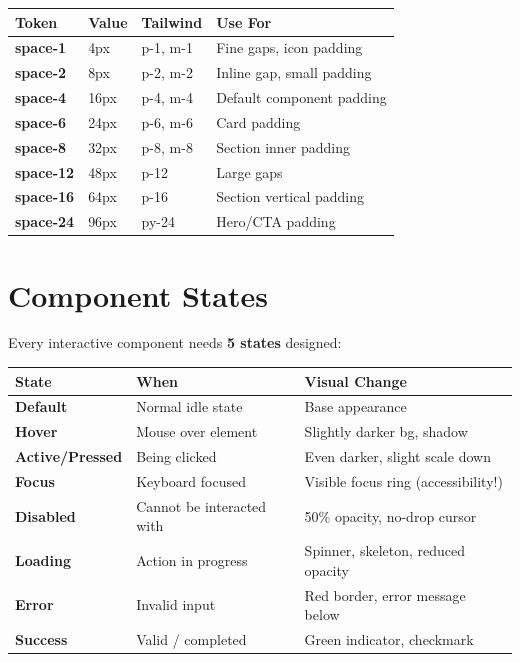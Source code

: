 \documentclass[12pt,a4paper]{article}
\begin{document}
\begin{center}
\begin{tabularx}{\textwidth}{|>{\bfseries}l|l|l|X|}
\hline
\rowcolor{FaranDark}
\color{white}\textbf{Token} & \color{white}\textbf{Value} & \color{white}\textbf{Tailwind} & \color{white}\textbf{Use For} \\
\hline
space-1 & 4px & p-1, m-1 & Fine gaps, icon padding \\
\hline
\rowcolor{SectionBg}
space-2 & 8px & p-2, m-2 & Inline gap, small padding \\
\hline
space-4 & 16px & p-4, m-4 & Default component padding \\
\hline
\rowcolor{SectionBg}
space-6 & 24px & p-6, m-6 & Card padding \\
\hline
space-8 & 32px & p-8, m-8 & Section inner padding \\
\hline
\rowcolor{SectionBg}
space-12 & 48px & p-12 & Large gaps \\
\hline
space-16 & 64px & p-16 & Section vertical padding \\
\hline
\rowcolor{SectionBg}
space-24 & 96px & py-24 & Hero/CTA padding \\
\hline
\end{tabularx}
\end{center}

\newpage

\section{Component States}

Every interactive component needs \textbf{5 states} designed:

\begin{center}
\begin{tabularx}{\textwidth}{|>{\bfseries\color{FaranViolet}}l|X|X|}
\hline
\rowcolor{FaranDark}
\color{white}\textbf{State} & \color{white}\textbf{When} & \color{white}\textbf{Visual Change} \\
\hline
Default & Normal idle state & Base appearance \\
\hline
\rowcolor{SectionBg}
Hover & Mouse over element & Slightly darker bg, shadow \\
\hline
Active/Pressed & Being clicked & Even darker, slight scale down \\
\hline
\rowcolor{SectionBg}
Focus & Keyboard focused & Visible focus ring (accessibility!) \\
\hline
Disabled & Cannot be interacted with & 50\% opacity, no-drop cursor \\
\hline
\rowcolor{SectionBg}
Loading & Action in progress & Spinner, skeleton, reduced opacity \\
\hline
Error & Invalid input & Red border, error message below \\
\hline
\rowcolor{SectionBg}
Success & Valid / completed & Green indicator, checkmark \\
\hline
\end{tabularx}
\end{center}
\end{document}
